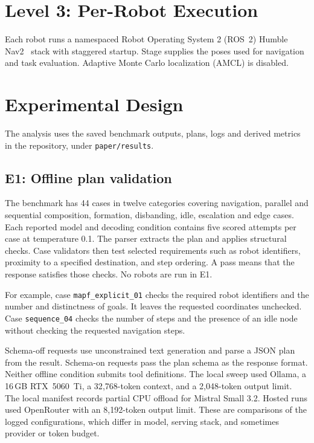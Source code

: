 \documentclass[pdflatex,sn-mathphys-num]{sn-jnl}
\newcommand{\code}[1]{{\def\{{\textnormal{\textbraceleft}}\def\}{\textnormal{\textbraceright}}\texttt{#1}}}
\begin{document}
\section{Level 3: Per-Robot Execution}
\label{sec:lvl3}

Each robot runs a namespaced Robot Operating System 2 (ROS~2) Humble~\citep{ros2}
Nav2~\citep{nav2} stack with staggered startup. Stage supplies the poses
used for navigation and task evaluation. Adaptive Monte Carlo localization
(AMCL) is disabled.

\section{Experimental Design}
\label{sec:design}

The analysis uses the saved benchmark outputs, plans, logs and derived
metrics in the repository, under \code{paper/results}.

\subsection{E1: Offline plan validation}
The benchmark has 44 cases in twelve categories covering navigation,
parallel and sequential composition, formation, disbanding, idle,
escalation and edge cases. Each reported model and decoding condition
contains five scored attempts per case at temperature 0.1. The parser
extracts the plan and applies structural checks. Case validators then
test selected requirements such as robot identifiers, proximity to a
specified destination, and step ordering. A pass means that the response
satisfies those checks. No robots are run in E1.

For example, case \code{mapf\_explicit\_01} checks the required robot
identifiers and the number and distinctness of goals. It leaves the requested
coordinates unchecked. Case \code{sequence\_04} checks the number of steps and
the presence of an idle node without checking the requested navigation steps.

Schema-off requests use unconstrained text generation and parse a JSON
plan from the result. Schema-on requests pass the plan schema as the
response format. Neither offline condition submits tool definitions.
The local sweep used Ollama, a 16\,GB RTX~5060~Ti, a 32{,}768-token context,
and a 2{,}048-token output limit. The local manifest records partial CPU
offload for Mistral Small 3.2. Hosted runs used OpenRouter with an
8{,}192-token output limit. These are comparisons of the logged
configurations, which differ in model, serving stack, and sometimes
provider or token budget.
\end{document}
